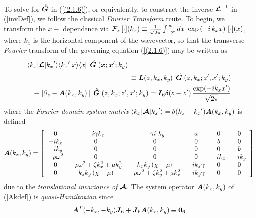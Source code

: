 To solve for $\stackrel{\scriptscriptstyle _{\,\,\circ}}{ \mbox{\boldmath$\mit G$\unboldmath}}$ in (\ref{(2.1.6)}), or equivalently, to construct 
the 
inverse  ${{\mbox{\boldmath$\cal L$\unboldmath}}}^{-1}$ in (\ref{invDef}), we follow the 
classical {\em Fourier Transform\/} route. To begin, we transform the $x-$ 
dependence via ${\cal F}_{x}\, [\cdot]({k}_{x})\equiv \frac{1}{\sqrt{2 
\pi}}\int_{-\infty }^{ \infty 
}dx\ \exp \left({-i\, {k}_{x} x}\right)\, [\cdot](x)$, where  ${k}_{x}$ is the 
horizontal 
component 
of the wavevector,
so that the transverse {\em Fourier\/} transform of the governing equation 
(\ref{(2.1.6)})
may be written as
\begin{eqnarray}	\label{FLdef}
\lefteqn{\langle { {k}_{x}} | {\CB L }| { {k}_{x}}^{\prime}\rangle
\langle { {k}_{x}}^{\prime}| x\rangle\langle x| \,\rf{\bmi 
G}({\bmi x};{\bmi x}^{\prime};k_y)}\nonumber\\
&&\equiv{\bmi  L}(z,{k}_{x},{k}_{y}) \,\rf{\bmi  G}(z,{k}_{x};z^{\prime},x^{\prime};k_y)\nonumber\\
&& \equiv \left[\partial_z -{\bmi  A}({k}_{x},{k}_{y})\,  \right]\,\rf{\bmi 
G}(z,{k}_{x};z^{\prime},x^{\prime};k_y)={\bmi  I}_{6} 
	\delta(z-z^{\prime}) \, \frac{\exp(-i {k}_{x} x^{\prime})}{\sqrt{2 \pi}}
\end{eqnarray}
where the {\em Fourier domain system matrix\/} $\langle { {k}_{x}} | {\mbox{\boldmath$\cal A$\unboldmath} }| 
{ {k}_{x}}^{\prime}\rangle= \delta({ {k}_{x}}-{ {k}_{x}}^{\prime}) {\mbox{\boldmath$\mit A$\unboldmath}}({k}_{x},{k}_{y})$ is defined
\begin{equation}	\label{Akdef}
	{\mbox{\boldmath$\mit A$\unboldmath}}({k}_{x},{k}_{y})=\left[{\begin{array}{cccccc} 
0&-i \gamma {  k}_{  x}& 
 - \gamma   i\ {k}_{y}&a&0&0\\ -i{k}_{x}&0&0&0&b&0\\ 
-i{k}_{y}&0&0&0&0&b\\ - \rho {\omega }^{  2}&  
0&0&0&-i{k}_{x}&-i{k}_{y}\\ 
0&- \rho {\omega }^{  2}  + 
\zeta {  k}_{  x}^{  2}  + \mu {  
k}_{  y}^{  2}&{  k}_{  x}{  k}_{ 
 y}\left({\chi   + \mu }\right)&  -i{k}_{x} \gamma 
&  0&0\\ 0&{k}_{x}{k}_{y}\left({ \chi   + \mu 
}\right)&- \rho {\omega }^{  2}  + \zeta {  
k}_{  y}^{  2}  + \mu {  k}_{  
x}^{  2}&  -i{k}_{y} \gamma &  0&0\end{array}}\right]
\end{equation}
due to the {\em translational invariance of\/} ${\mbox{\boldmath$\cal A$\unboldmath} }$.
The system operator ${\mbox{\boldmath$\mit A$\unboldmath}}({k}_{x},{k}_{y})$ of 
(\ref{Akdef}) is {\em quasi-Hamiltonian\/} since
\begin{equation} \label{ATdef}
{\mbox{\boldmath$\mit A$\unboldmath}}^{T}(-{k}_{x},-{k}_{y}){\mbox{\boldmath$\mit J$\unboldmath}}_6 + {\mbox{\boldmath$\mit J$\unboldmath}}_6 {\mbox{\boldmath$\mit A$\unboldmath}}({k}_{x},{k}_{y}) \equiv {\bf 0}_6
\end{equation}
